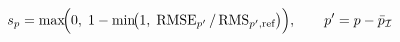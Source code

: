 \documentclass[12pt]{article}
\begin{document}
\begin{equation*}
s_p = \max\!\Bigl(0,\; 1 - \min\!\bigl(1,\; \text{RMSE}_{p^\prime}\, /\, \text{RMS}_{p^\prime,\text{ref}}\bigr)\Bigr), \qquad p^\prime = p - \bar{p}_{\mathcal{I}}
\end{equation*}
\end{document}
